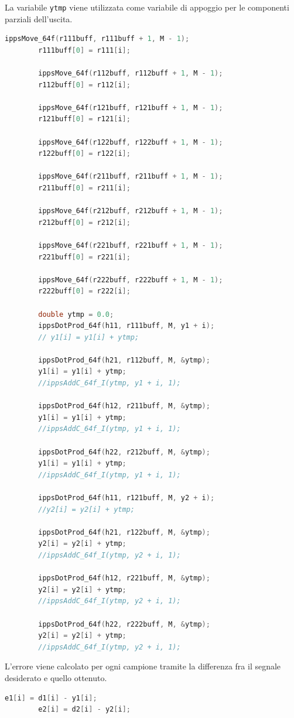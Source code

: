\documentclass[12pt,a4paper,titlepage]{article}
\begin{document}
La variabile \texttt{ytmp} viene utilizzata come variabile di appoggio per le componenti parziali dell'uscita.
\begin{lstlisting}[language=cpp, label=code:uscite, caption = Calcolo delle uscite, breaklines = false, captionpos = b]
		ippsMove_64f(r111buff, r111buff + 1, M - 1);
		r111buff[0] = r111[i];

		ippsMove_64f(r112buff, r112buff + 1, M - 1);
		r112buff[0] = r112[i];

		ippsMove_64f(r121buff, r121buff + 1, M - 1);
		r121buff[0] = r121[i];

		ippsMove_64f(r122buff, r122buff + 1, M - 1);
		r122buff[0] = r122[i];

		ippsMove_64f(r211buff, r211buff + 1, M - 1);
		r211buff[0] = r211[i];

		ippsMove_64f(r212buff, r212buff + 1, M - 1);
		r212buff[0] = r212[i];

		ippsMove_64f(r221buff, r221buff + 1, M - 1);
		r221buff[0] = r221[i];

		ippsMove_64f(r222buff, r222buff + 1, M - 1);
		r222buff[0] = r222[i];

		double ytmp = 0.0;
		ippsDotProd_64f(h11, r111buff, M, y1 + i);
		// y1[i] = y1[i] + ytmp;

		ippsDotProd_64f(h21, r112buff, M, &ytmp);
		y1[i] = y1[i] + ytmp;
		//ippsAddC_64f_I(ytmp, y1 + i, 1);

		ippsDotProd_64f(h12, r211buff, M, &ytmp);
		y1[i] = y1[i] + ytmp;
		//ippsAddC_64f_I(ytmp, y1 + i, 1);

		ippsDotProd_64f(h22, r212buff, M, &ytmp);
		y1[i] = y1[i] + ytmp;
		//ippsAddC_64f_I(ytmp, y1 + i, 1);

		ippsDotProd_64f(h11, r121buff, M, y2 + i);
		//y2[i] = y2[i] + ytmp;

		ippsDotProd_64f(h21, r122buff, M, &ytmp);
		y2[i] = y2[i] + ytmp;
		//ippsAddC_64f_I(ytmp, y2 + i, 1);

		ippsDotProd_64f(h12, r221buff, M, &ytmp);
		y2[i] = y2[i] + ytmp;
		//ippsAddC_64f_I(ytmp, y2 + i, 1);

		ippsDotProd_64f(h22, r222buff, M, &ytmp);
		y2[i] = y2[i] + ytmp;
		//ippsAddC_64f_I(ytmp, y2 + i, 1);
\end{lstlisting}
L'errore viene calcolato per ogni campione tramite la differenza fra il segnale desiderato e quello ottenuto.
\begin{lstlisting}[language=cpp]
		e1[i] = d1[i] - y1[i];
		e2[i] = d2[i] - y2[i];
\end{lstlisting}
\end{document}
